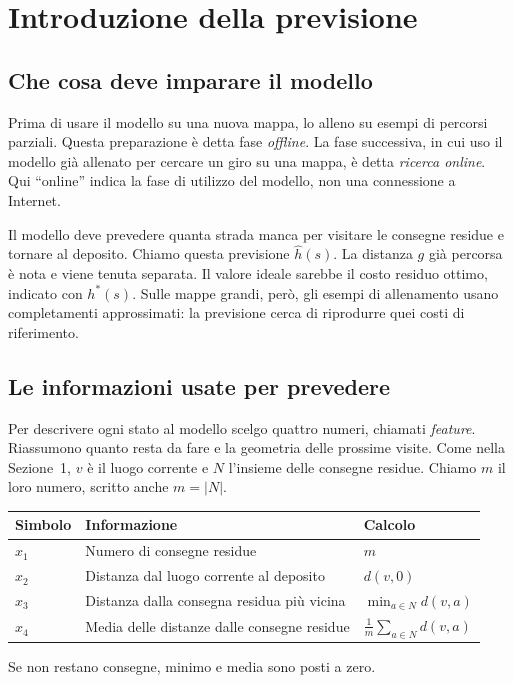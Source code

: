 \section{Introduzione della previsione}
\label{sec:model}
\subsection{Che cosa deve imparare il modello}
Prima di usare il modello su una nuova mappa, lo alleno su esempi di
percorsi parziali. Questa preparazione è detta fase \emph{offline}.
La fase successiva, in cui uso il modello già allenato per cercare un giro
su una mappa, è detta \emph{ricerca online}. Qui ``online'' indica la fase
di utilizzo del modello, non una connessione a Internet.

Il modello deve prevedere quanta strada manca per visitare le consegne
residue e tornare al deposito. Chiamo questa previsione $\widehat h(s)$.
La distanza $g$ già percorsa è nota e viene tenuta separata.
Il valore ideale sarebbe il costo residuo ottimo, indicato con $h^*(s)$.
Sulle mappe grandi, però, gli esempi di allenamento usano completamenti
approssimati: la previsione cerca di riprodurre quei costi di riferimento.

\subsection{Le informazioni usate per prevedere}
Per descrivere ogni stato al modello scelgo quattro numeri, chiamati
\emph{feature}. Riassumono quanto resta da fare e la geometria delle prossime
visite. Come nella Sezione~1, $v$ è il luogo corrente e $N$ l'insieme delle
consegne residue. Chiamo $m$ il loro numero, scritto anche $m=|N|$.

\begin{center}\small
\begin{tabular}{lll}
\toprule
Simbolo & Informazione & Calcolo\\
\midrule
$x_1$ & Numero di consegne residue & $m$\\
$x_2$ & Distanza dal luogo corrente al deposito & $d(v,0)$\\
$x_3$ & Distanza dalla consegna residua più vicina & $\min_{a\in N}d(v,a)$\\
$x_4$ & Media delle distanze dalle consegne residue & $\frac{1}{m}\sum_{a\in N}d(v,a)$\\
\bottomrule
\end{tabular}
\end{center}
Se non restano consegne, minimo e media sono posti a zero.

